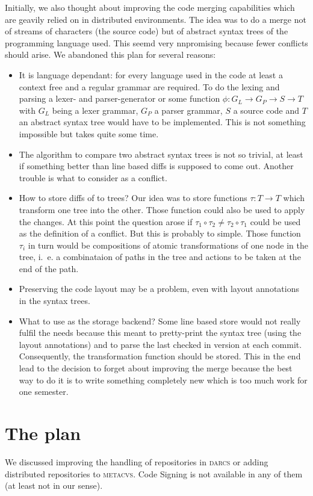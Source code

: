 \documentclass[fleqn, 10pt, a4paper]{article}
\begin{document}
Initially, we also thought about improving the code merging capabilities
which are geavily relied on in distributed environments. The idea was to
do a merge not of streams of characters (the source code) but of
abstract syntax trees of the programming language used. This seemd very
nnpromising because fewer conflicts should arise. We abandoned this plan
for several reasons:
\begin{itemize}
\item It is language dependant: for every language used in the code at
least a context free and a regular grammar are  required. To do the
lexing and parsing a lexer- and parser-generator or some function $\phi
: G_L \rightarrow G_P \rightarrow S \rightarrow T$ with $G_L$ being a
lexer grammar, $G_P$ a parser grammar, $S$ a source code and $T$ an
abstract syntax tree would have to be implemented. This is not something
impossible but takes quite some time.
\item The algorithm to compare two abstract syntax trees is not so
trivial, at least if something better than line based diffs is supposed
to come out. Another trouble is what to consider as a conflict.
\item How to store diffs of to trees? Our idea was to store functions
$\tau : T \rightarrow T$ which transform one tree into the other. Those
function could also be used to apply the changes. At this point the
question arose if $\tau_1 \circ \tau_2 \neq \tau_2 \circ \tau_1$ could
be used as the definition of a conflict. But this is probably to simple.
Those function $\tau_i$ in turn would be compositions of atomic
transformations of one node in the tree, i.~e. a combinataion of paths
in the tree and actions to be taken at the end of the path.
\item Preserving the code layout may be a problem, even with layout
annotations in the syntax trees.
\item What to use as the storage backend? Some line based store would
not really fulfil the needs because this meant to pretty-print the
syntax tree (using the layout annotations) and to parse the last checked in
version at each commit. Consequently, the transformation function
should be stored. This in the end lead to the decision to forget about
improving the merge because the best way to do it is to write something
completely new which is too much work for one semester.
\end{itemize}

\section{The plan}
We discussed improving the handling of repositories in \textsc{darcs} or
adding distributed repositories to \textsc{metacvs}. Code Signing is not
available in any of them (at least not in our sense).
\end{document}
